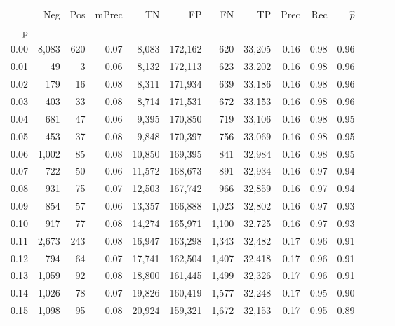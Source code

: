 \begin{tabular}{rrrrrrrrrrrrrr}
\toprule
{} &    Neg &  Pos & mPrec &       TN &       FP &      FN &      TP &  Prec &   Rec & $\hat{p}$ \\
p    &        &      &       &          &          &         &         &       &       &           \\
\midrule
0.00 &  8,083 &  620 &  0.07 &    8,083 &  172,162 &     620 &  33,205 &  0.16 &  0.98 &      0.96 \\
0.01 &     49 &    3 &  0.06 &    8,132 &  172,113 &     623 &  33,202 &  0.16 &  0.98 &      0.96 \\
0.02 &    179 &   16 &  0.08 &    8,311 &  171,934 &     639 &  33,186 &  0.16 &  0.98 &      0.96 \\
0.03 &    403 &   33 &  0.08 &    8,714 &  171,531 &     672 &  33,153 &  0.16 &  0.98 &      0.96 \\
0.04 &    681 &   47 &  0.06 &    9,395 &  170,850 &     719 &  33,106 &  0.16 &  0.98 &      0.95 \\
0.05 &    453 &   37 &  0.08 &    9,848 &  170,397 &     756 &  33,069 &  0.16 &  0.98 &      0.95 \\
0.06 &  1,002 &   85 &  0.08 &   10,850 &  169,395 &     841 &  32,984 &  0.16 &  0.98 &      0.95 \\
0.07 &    722 &   50 &  0.06 &   11,572 &  168,673 &     891 &  32,934 &  0.16 &  0.97 &      0.94 \\
0.08 &    931 &   75 &  0.07 &   12,503 &  167,742 &     966 &  32,859 &  0.16 &  0.97 &      0.94 \\
0.09 &    854 &   57 &  0.06 &   13,357 &  166,888 &   1,023 &  32,802 &  0.16 &  0.97 &      0.93 \\
0.10 &    917 &   77 &  0.08 &   14,274 &  165,971 &   1,100 &  32,725 &  0.16 &  0.97 &      0.93 \\
0.11 &  2,673 &  243 &  0.08 &   16,947 &  163,298 &   1,343 &  32,482 &  0.17 &  0.96 &      0.91 \\
0.12 &    794 &   64 &  0.07 &   17,741 &  162,504 &   1,407 &  32,418 &  0.17 &  0.96 &      0.91 \\
0.13 &  1,059 &   92 &  0.08 &   18,800 &  161,445 &   1,499 &  32,326 &  0.17 &  0.96 &      0.91 \\
0.14 &  1,026 &   78 &  0.07 &   19,826 &  160,419 &   1,577 &  32,248 &  0.17 &  0.95 &      0.90 \\
0.15 &  1,098 &   95 &  0.08 &   20,924 &  159,321 &   1,672 &  32,153 &  0.17 &  0.95 &      0.89 \\

\end{tabular}
